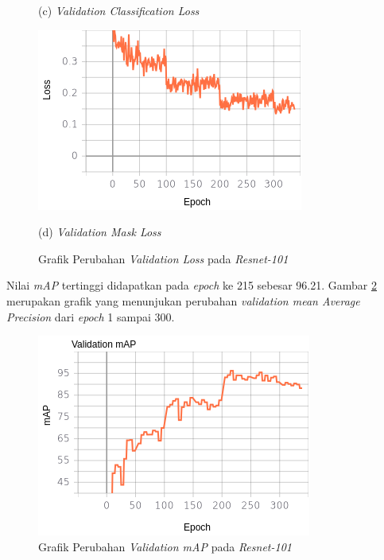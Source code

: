 \begin{figure}[H]
\begin{minipage}{0.45\textwidth}
		\caption*{(c) \textit{Validation Classification Loss}}
	\end{minipage}
	\hfill
	\begin{minipage}{0.45\textwidth}
		\includegraphics[width=\textwidth]{gambar/training_resnet50/tugas-akhir-Page-16 (3).png}
		\caption*{(d) \textit{Validation Mask Loss}}
	\end{minipage}
	\caption{Grafik Perubahan \textit{Validation Loss} pada \textit{Resnet-101}}
	\label{fig:resnet101-val}
\end{figure}

Nilai \textit{mAP} tertinggi didapatkan pada \textit{epoch} ke 215 sebesar 96.21. Gambar \ref{fig:resnet101-map} merupakan grafik yang menunjukan perubahan \textit{validation mean Average Precision} dari \textit{epoch} 1 sampai 300.

\begin{figure}[h]
	\centering
	\includegraphics[scale=0.4]{gambar/resnet101-map.png}
	\caption{Grafik Perubahan \textit{Validation mAP} pada \textit{Resnet-101}}
	\label{fig:resnet101-map}
\end{figure} 

